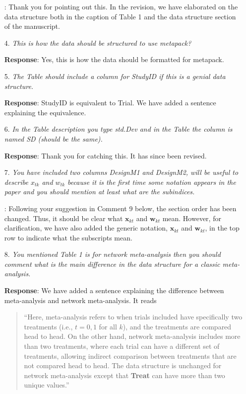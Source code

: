 \documentclass[11pt]{article}
\newcommand{\1}{{\bf{{1}}}}
\begin{document}
\begin{itemize}
\medskip
{}: Thank you for pointing out this. In the revision, we have elaborated on the data structure both in the caption of Table 1 and the data
structure section of the manuscript.

\item[4.] {\it This is how the data should be structured to use metapack?}

\medskip
\noindent
{\bf Response}: Yes, this is how the data should be formatted for metapack.



\item[5.] {\it The Table should include a column for StudyID if this is a genial data structure.}

\medskip
\noindent
{\bf Response}: StudyID is equivalent to Trial. We have added a sentence explaining the equivalence.


\item[6.] {\it In the Table description you type std.Dev and in the Table the column is named SD (should be the same).}

\medskip
\noindent
{\bf Response}: Thank you for catching this. It has since been revised.


\item[7.] {\it You have included two columns DesignM1 and DesignM2, will be useful to describe $x_{tk}$ and $w_{tk}$ because it is the first time some notation appears in the paper and you should mention at least what are the subindices.}

\medskip
{}: Following your suggestion in Comment 9 below,  the section order has been changed.
 Thus, it should be clear what $\bm{x}_{kt}$ and
$\bm{w}_{kt}$ mean. However, for clarification, we have also added the generic notation, $\bm{x}_{kt}$ and $\bm{w}_{kt}$, in the top row to indicate what the
subscripts mean.


\item[8.] {\it You mentioned Table 1 is for network meta-analysis then you should comment what is the main difference in the data structure for a classic meta-analysis.}

\medskip
\noindent
{\bf Response}: We have added a sentence explaining the difference between meta-analysis and network meta-analysis. It reads
\begin{quote}
    ``Here, meta-analysis refers to when trials included have specifically two treatments (i.e., $t=0,1$ for all $k$), and the treatments are compared head to head. On the other hand, network meta-analysis includes more than two treatments, where each trial can have a different set of treatments, allowing indirect comparison between treatments that are not compared head to head. The data structure is unchanged for network meta-analysis except that \textbf{Treat} can have more than two unique values.''
\end{quote}



\end{itemize}
\end{document}
